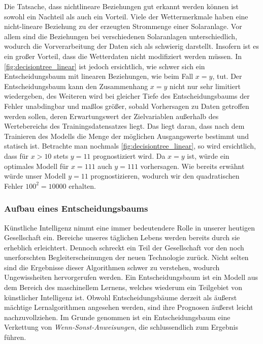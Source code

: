 \documentclass[12pt, a4paper]{article}
\begin{document}
Die Tatsache, dass nichtlineare Beziehungen gut erkannt werden können ist sowohl ein Nachteil als auch ein Vorteil. Viele der Wettermerkmale haben eine nicht-lineare Beziehung zu der erzeugten Strommenge einer Solaranlage. Vor allem sind die Beziehungen bei verschiedenen Solaranlagen unterschiedlich, wodurch die Vorverarbeitung der Daten sich als schwierig darstellt. Insofern ist es ein großer Vorteil, dass die Wetterdaten nicht modifiziert werden müssen. In \autoref{fig:decisiontree_linear} ist jedoch ersichtlich, wie schwer sich ein Entscheidungsbaum mit linearen Beziehungen, wie beim Fall $x=y$, tut. Der Entscheidungsbaum kann den Zusammenhang $x=y$ nicht nur sehr limitiert wiedergeben, des Weiteren wird bei gleicher Tiefe des Entscheidungsbaums der Fehler  unabdingbar und maßlos größer, sobald Vorhersagen zu Daten getroffen werden sollen, deren Erwartungswert der Zielvariablen außerhalb des Wertebereichs des Trainingsdatensatzes liegt. Das liegt daran, dass nach dem Trainieren des Modells die Menge der möglichen Ausgangswerte bestimmt und statisch ist. Betrachte man nochmals \autoref{fig:decisiontree_linear}, so wird ersichtlich, dass für $x>10$ stets $y=11$ prognostiziert wird. Da $x=y$ ist, würde ein optimales Modell für $x=111$ auch $y=111$ vorhersagen. Wie bereits erwähnt würde unser Modell $y=11$ prognostizieren, wodurch wir den quadratischen Fehler $100^{2}=10000$ erhalten. 

\subsubsection{Aufbau eines Entscheidungsbaums}
\label{subsubsec:decisiontree_structure}

Künstliche Intelligenz nimmt eine immer bedeutendere Rolle in unserer heutigen Gesellschaft ein. Bereiche unseres täglichen Lebens werden bereits durch sie erheblich erleichtert. Dennoch schreckt ein Teil der Gesellschaft vor den noch unerforschten Begleiterscheinungen der neuen Technologie zurück. Nicht selten sind die Ergebnisse dieser Algorithmen schwer zu verstehen, wodurch Ungewissheiten hervorgerufen werden. 
Ein Entscheidungsbaum ist ein Modell aus dem Bereich des maschinellem Lernens, welches wiederum ein Teilgebiet von künstlicher Intelligenz ist. Obwohl Entscheidungsbäume derzeit als äußerst mächtige Lernalgorithmen angesehen werden, sind ihre Prognosen äußerst leicht nachzuvollziehen. Im Grunde genommen ist ein Entscheidungsbaum eine Verkettung von \textit{Wenn-Sonst-Anweisungen}, die schlussendlich zum Ergebnis führen. 
\end{document}
